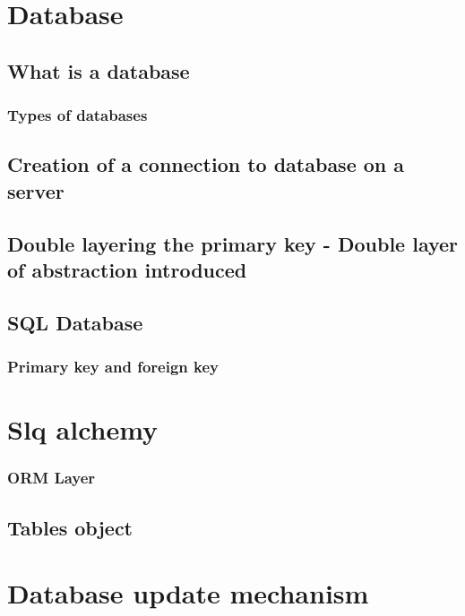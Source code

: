 \documentclass[../main.tex]{subfiles}
\begin{document}
\section{Database}
\subsection{What is a database}
\subsubsection{Types of databases}
\subsection{Creation of a connection to database on a server}
\subsection{Double layering the primary key - Double layer of abstraction introduced}
\subsection{SQL Database}
\subsubsection{Primary key and foreign key}
\section{Slq alchemy}
\subsubsection{ORM Layer}
\subsection{Tables object}
\section{Database update mechanism}
\cleardoublepage
\end{document}
